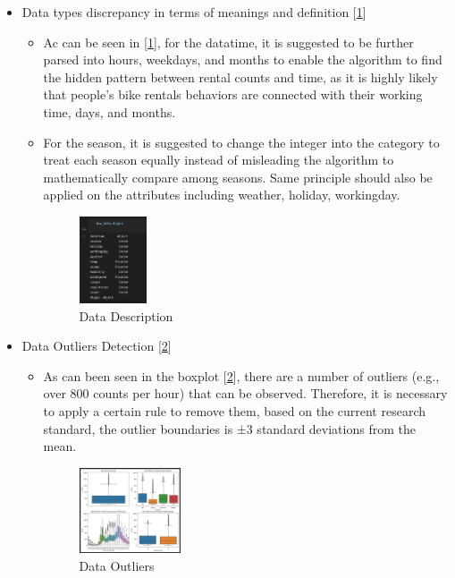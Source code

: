 \begin{itemize}
  \item Data types discrepancy in terms of meanings and definition [\ref{fig:diagram}]
  \begin{itemize}
    \item Ac can be seen in [\ref{fig:diagram}], for the datatime, it is suggested to be further parsed into hours, weekdays, and months to enable the algorithm to find the hidden pattern between rental counts and time, as it is highly likely that people's bike rentals behaviors are connected with their working time, days, and months.
    \item For the season, it is suggested to change the integer into the category to treat each season equally instead of misleading the algorithm to mathematically compare among seasons. Same principle should also be applied on the attributes including weather, holiday, workingday.
        \begin{figure}[!ht]
        	\centering
        	\setlength{\abovecaptionskip}{0.cm}
        	\setlength{\belowcaptionskip}{-0.cm}
        	\includegraphics[width=0.2\textwidth]{./figures/DataType.png}
        	\caption{Data Description}
        	\label{fig:diagram}
        \end{figure}
  \end{itemize}
 
  \item Data Outliers Detection [\ref{fig:outliers}]
  \begin{itemize}
    \item As can been seen in the boxplot [\ref{fig:outliers}], there are a number of outliers (e.g., over 800 counts per hour) that can be observed. Therefore, it is necessary to apply a certain rule to remove them, based on the current research standard, the outlier boundaries is ±3 standard deviations from the mean.
         \begin{figure}[!ht]
        	\centering
        	\setlength{\abovecaptionskip}{0.cm}
        	\setlength{\belowcaptionskip}{-0.cm}
        	\includegraphics[width=0.3\textwidth]{./figures/DataOutliers.png}
        	\caption{Data Outliers}
        	\label{fig:outliers}
        \end{figure}
  \end{itemize}
 

\end{itemize}
